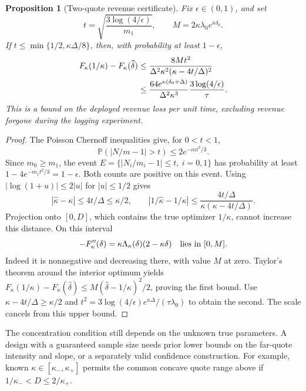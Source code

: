 \documentclass[11pt]{article}
\theoremstyle{plain}
\newtheorem{proposition}[theorem]{Proposition}
\theoremstyle{definition}
\theoremstyle{remark}
\begin{document}
\begin{proposition}[Two-quote revenue certificate]\label{prop:twoquote}
Fix \(\epsilon\in(0,1)\), and set
\[
t=\sqrt{\frac{3\log(4/\epsilon)}{m_1}},\qquad
M=2\kappa\lambda_0e^{\kappa\delta_0}.
\]
If \(t\le\min\{1/2,\kappa\Delta/8\}\), then, with probability
at least \(1-\epsilon\),
\begin{align}
F_\kappa(1/\kappa)-F_\kappa(\widehat\delta)
&\le \frac{8Mt^2}{\Delta^2\kappa^2(\kappa-4t/\Delta)^2}
\notag\\
&\le\frac{64e^{\kappa(\delta_0+\Delta)}}{\Delta^2\kappa^3}
                       \frac{3\log(4/\epsilon)}{\tau}.
\label{eq:twoquote}
\end{align}
This is a bound on the deployed revenue loss per unit time, excluding
revenue forgone during the logging experiment.
\end{proposition}
\begin{proof}
The Poisson Chernoff inequalities give, for \(0<t<1\),
\[
\mathbb P(|N/m-1|>t)\le2e^{-mt^2/3}.
\]
Since \(m_0\ge m_1\), the event
\(E=\{|N_i/m_i-1|\le t,\ i=0,1\}\) has probability at least
\(1-4e^{-m_1t^2/3}=1-\epsilon\). Both counts are positive on this
event. Using \(|\log(1+u)|\le2|u|\) for \(|u|\le1/2\) gives
\[
|\widehat\kappa-\kappa|
\le4t/\Delta\le\kappa/2,
\qquad
|1/\widehat\kappa-1/\kappa|
\le\frac{4t/\Delta}{\kappa(\kappa-4t/\Delta)}.
\]
Projection onto \([0,D]\), which contains the true optimizer
\(1/\kappa\), cannot increase this distance. On this interval
\[
-F_\kappa''(\delta)=\kappa\Lambda_\kappa(\delta)(2-\kappa\delta)
\quad\hbox{lies in }[0,M].
\]
Indeed it is nonnegative and decreasing there, with value \(M\)
at zero. Taylor's theorem around the interior optimum yields
\(F_\kappa(1/\kappa)-F_\kappa(\widehat\delta)
\le M(\widehat\delta-1/\kappa)^2/2\), proving the first bound.
Use \(\kappa-4t/\Delta\ge\kappa/2\) and
\(t^2=3\log(4/\epsilon)e^{\kappa\Delta}/(\tau\lambda_0)\)
to obtain the second. The scale cancels from this upper bound.
\end{proof}

The concentration condition still depends on the unknown true
parameters. A design with a guaranteed sample size needs prior lower
bounds on the far-quote intensity and slope, or a separately valid
confidence construction. For example, known
\(\kappa\in[\kappa_-,\kappa_+]\) permits the common concave quote
range above if \(1/\kappa_-<D\le2/\kappa_+\).
\end{document}

